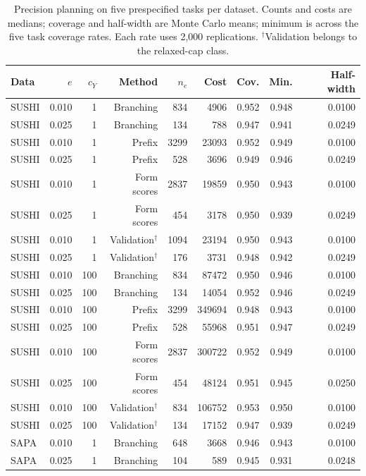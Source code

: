 \begin{table}[t]
\centering
\caption{Precision planning on five prespecified tasks per dataset. Counts and costs are medians; coverage and half-width are Monte Carlo means; minimum is across the five task coverage rates. Each rate uses 2,000 replications. $^\dagger$Validation belongs to the relaxed-cap class.}
\label{tab:precisiondetail}
\small
\setlength{\tabcolsep}{4pt}
\begin{tabular}{lrrrrrrrr}
\toprule
Data & $e$ & $c_Y$ & Method & $n_e$ & Cost & Cov. & Min. & Half-width \\
\midrule
SUSHI & 0.010 & 1 & Branching & 834 & 4906 & 0.952 & 0.948 & 0.0100 \\
SUSHI & 0.025 & 1 & Branching & 134 & 788 & 0.947 & 0.941 & 0.0249 \\
SUSHI & 0.010 & 1 & Prefix & 3299 & 23093 & 0.952 & 0.949 & 0.0100 \\
SUSHI & 0.025 & 1 & Prefix & 528 & 3696 & 0.949 & 0.946 & 0.0249 \\
SUSHI & 0.010 & 1 & Form scores & 2837 & 19859 & 0.950 & 0.943 & 0.0100 \\
SUSHI & 0.025 & 1 & Form scores & 454 & 3178 & 0.950 & 0.939 & 0.0249 \\
SUSHI & 0.010 & 1 & Validation$^\dagger$ & 1094 & 23194 & 0.950 & 0.943 & 0.0100 \\
SUSHI & 0.025 & 1 & Validation$^\dagger$ & 176 & 3731 & 0.948 & 0.942 & 0.0249 \\
SUSHI & 0.010 & 100 & Branching & 834 & 87472 & 0.950 & 0.946 & 0.0100 \\
SUSHI & 0.025 & 100 & Branching & 134 & 14054 & 0.952 & 0.946 & 0.0249 \\
SUSHI & 0.010 & 100 & Prefix & 3299 & 349694 & 0.948 & 0.943 & 0.0100 \\
SUSHI & 0.025 & 100 & Prefix & 528 & 55968 & 0.951 & 0.947 & 0.0249 \\
SUSHI & 0.010 & 100 & Form scores & 2837 & 300722 & 0.952 & 0.949 & 0.0100 \\
SUSHI & 0.025 & 100 & Form scores & 454 & 48124 & 0.951 & 0.945 & 0.0250 \\
SUSHI & 0.010 & 100 & Validation$^\dagger$ & 834 & 106752 & 0.953 & 0.950 & 0.0100 \\
SUSHI & 0.025 & 100 & Validation$^\dagger$ & 134 & 17152 & 0.947 & 0.939 & 0.0249 \\
SAPA & 0.010 & 1 & Branching & 648 & 3668 & 0.946 & 0.943 & 0.0100 \\
SAPA & 0.025 & 1 & Branching & 104 & 589 & 0.945 & 0.931 & 0.0248 \\

\end{tabular}
\end{table}

